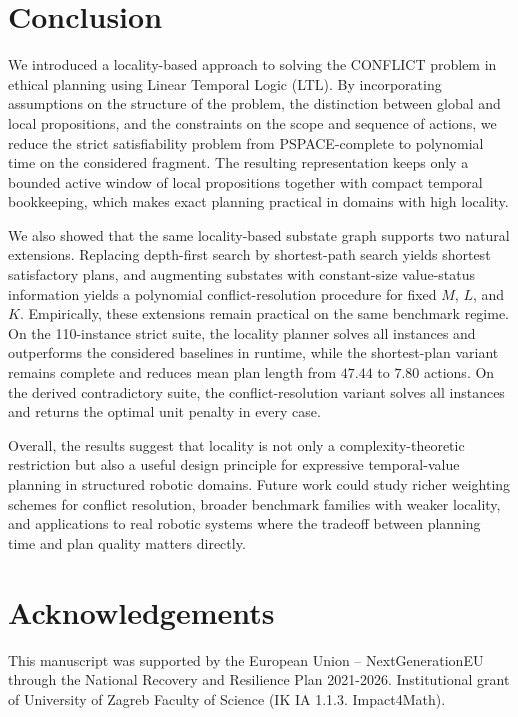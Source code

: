 \documentclass[a4paper,fleqn]{cas-dc}
\begin{document}
\section{Conclusion}\label{conc}

We introduced a locality-based approach to solving the CONFLICT problem in ethical planning using Linear Temporal Logic (LTL). By incorporating assumptions on the structure of the problem, the distinction between global and local propositions, and the constraints on the scope and sequence of actions, we reduce the strict satisfiability problem from PSPACE-complete to polynomial time on the considered fragment. The resulting representation keeps only a bounded active window of local propositions together with compact temporal bookkeeping, which makes exact planning practical in domains with high locality.

We also showed that the same locality-based substate graph supports two natural extensions. Replacing depth-first search by shortest-path search yields shortest satisfactory plans, and augmenting substates with constant-size value-status information yields a polynomial conflict-resolution procedure for fixed $M$, $L$, and $K$. Empirically, these extensions remain practical on the same benchmark regime. On the 110-instance strict suite, the locality planner solves all instances and outperforms the considered baselines in runtime, while the shortest-plan variant remains complete and reduces mean plan length from $47.44$ to $7.80$ actions. On the derived contradictory suite, the conflict-resolution variant solves all instances and returns the optimal unit penalty in every case.

Overall, the results suggest that locality is not only a complexity-theoretic restriction but also a useful design principle for expressive temporal-value planning in structured robotic domains. Future work could study richer weighting schemes for conflict resolution, broader benchmark families with weaker locality, and applications to real robotic systems where the tradeoff between planning time and plan quality matters directly.

\section{Acknowledgements}

This manuscript was supported by the European Union – NextGenerationEU through the National Recovery and Resilience Plan 2021-2026. Institutional grant of University of Zagreb Faculty of Science (IK IA 1.1.3. Impact4Math).
\end{document}
